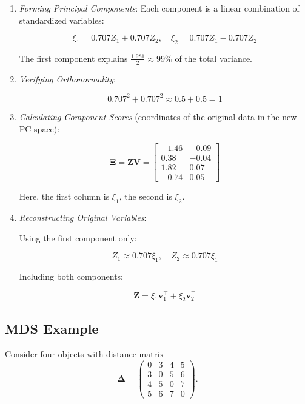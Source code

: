 \begin{enumerate}
    \item \textit{Forming Principal Components}: Each component is a linear combination of standardized variables:

    \[
    \xi_1 = 0.707 Z_1 + 0.707 Z_2, \quad
    \xi_2 = 0.707 Z_1 - 0.707 Z_2
    \]

    The first component explains $\frac{1.981}{2} \approx 99\%$ of the total variance.

    \item \textit{Verifying Orthonormality}:

    \[
    0.707^2 + 0.707^2 \approx 0.5 + 0.5 = 1
    \]

    \item \textit{Calculating Component Scores} (coordinates of the original data in the new PC space):

    \[
    \mathbf{\Xi} = \mathbf{Z} \mathbf{V} =
    \begin{bmatrix}
    -1.46 & -0.09 \\
     0.38 & -0.04 \\
     1.82 & 0.07 \\
    -0.74 & 0.05
    \end{bmatrix}
    \]

    Here, the first column is $\xi_1$, the second is $\xi_2$.

    \item \textit{Reconstructing Original Variables}:

    Using the first component only:

    \[
    Z_1 \approx 0.707 \xi_1, \quad Z_2 \approx 0.707 \xi_1
    \]

    Including both components:

    \[
    \mathbf{Z} = \xi_1 \mathbf{v}_1^\top + \xi_2 \mathbf{v}_2^\top
    \]

\end{enumerate}



\newpage


\subsection{MDS Example}
\label{worked-mds}

\medskip

Consider four objects with distance matrix
\[
\mathbf{\Delta}
=
\begin{pmatrix}
0 & 3 & 4 & 5 \\
3 & 0 & 5 & 6 \\
4 & 5 & 0 & 7 \\
5 & 6 & 7 & 0
\end{pmatrix}.
\]

